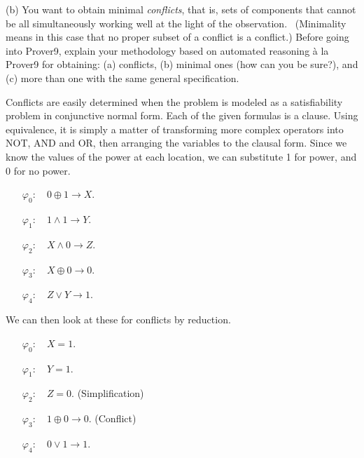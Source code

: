 \documentclass[fullpage]{article}
\begin{document}
(b) You want to obtain minimal {\em conflicts}, that is, sets of components that cannot be all simultaneously working well  at the light of the observation. \ (Minimality means in this case that no proper subset of a conflict is a conflict.) Before going into Prover9, explain your methodology based on automated reasoning \`a la Prover9 for obtaining: (a) conflicts, (b) minimal ones (how can you be sure?), and (c) more than one with the same general specification.\\

Conflicts are easily determined when the problem is modeled as a satisfiability problem in conjunctive normal form. Each of the given formulas is a clause. Using equivalence, it is simply a matter of transforming more complex operators into NOT, AND and OR, then arranging the variables to the clausal form. Since we know the values of the power at each location, we can substitute 1 for power, and 0 for no power.

\begin{itemize}
\item[$\varphi_0$:]~ ${0 \oplus 1 \rightarrow X}$.
 \item[$\varphi_1$:]~ ${1 \wedge 1 \rightarrow Y}$.
 \item[$\varphi_2$:]~ ${X \wedge 0 \rightarrow Z}$.
\item[$\varphi_3$:]~ ${X \oplus 0 \rightarrow 0}$.
\item[$\varphi_4$:]~ ${Z \vee Y \rightarrow 1}$.
\end{itemize}

We can then look at these for conflicts by reduction.

\begin{itemize}
\item[$\varphi_0$:]~ ${X = 1}$.
 \item[$\varphi_1$:]~ ${Y = 1}$.
 \item[$\varphi_2$:]~ ${Z = 0}$. (Simplification)
\item[$\varphi_3$:]~ ${1 \oplus 0 \rightarrow 0}$. (Conflict)
\item[$\varphi_4$:]~ ${0 \vee 1\rightarrow 1}$.
\end{itemize}
\end{document}
